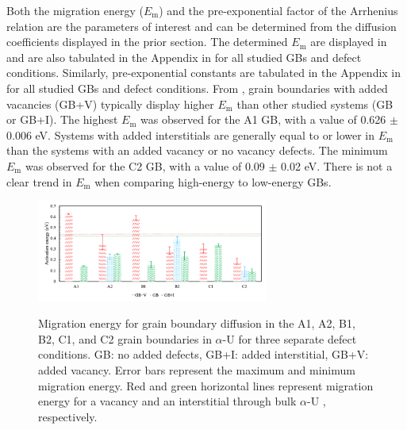 \documentclass[review]{elsarticle}
\begin{document}
Both the migration energy ($E_{\mathrm{m}}$) and the pre-exponential factor of the Arrhenius relation are the parameters of interest and can be determined from the diffusion coefficients displayed in the prior section. The determined $E_{\mathrm{m}}$ are displayed in  and are also tabulated in the Appendix in  for all studied GBs and defect conditions. Similarly, pre-exponential constants are tabulated in the Appendix in  for all studied GBs and defect conditions. From , grain boundaries with added vacancies (GB+V) typically display higher $E_{\mathrm{m}}$ than other studied systems (GB or GB+I). The highest $E_{\mathrm{m}}$ was observed for the A1 GB, with a value of 0.626 $\pm$ 0.006 eV. Systems with added interstitials are generally equal to or lower in $E_{\mathrm{m}}$ than the systems with an added vacancy or no vacancy defects. The minimum $E_{\mathrm{m}}$ was observed for the C2 GB, with a value of 0.09 $\pm$ 0.02 eV. There is not a clear trend in $E_{\mathrm{m}}$ when comparing high-energy to low-energy GBs. 

\begin{figure}[h!]
\centering
\includegraphics[width = 3in]{migration.png}\
\caption{Migration energy for grain boundary diffusion in the A1, A2, B1, B2, C1, and C2 grain boundaries in $\alpha$-U for three separate defect conditions. GB: no added defects, GB+I: added interstitial, GB+V: added vacancy. Error bars represent the maximum and minimum migration energy. Red and green horizontal lines represent migration energy for a vacancy and an interstitial through bulk $\alpha$-U \cite{WANG2023154289}, respectively.}
\label{fig:Migra}
\end{figure}
\end{document}
